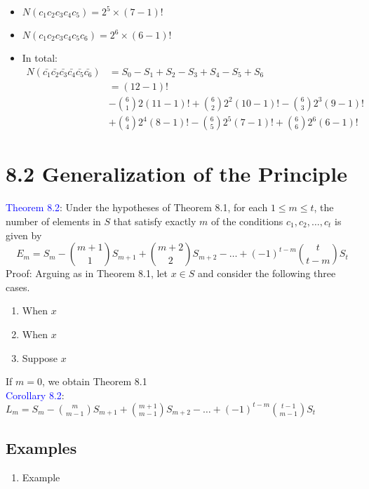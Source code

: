 \documentclass[a4paper]{article}
\begin{document}
\begin{enumerate}
\begin{itemize}
        \item $N(c_1c_2c_3c_4c_5)=2^5 \times (7-1)!$
        \item $N(c_1c_2c_3c_4c_5c_6)=2^6 \times (6-1)!$
        \item In total:\\
        \begin{align*}
            N(\bar{c_1}\bar{c_2}\bar{c_3}\bar{c_4}\bar{c_5}\bar{c_6})&=S_0-S_1+S_2-S_3+S_4-S_5+S_6\\
            &=(12-1)!\\
            &-\binom{6}{1}2(11-1)!+\binom{6}{2}2^2(10-1)!-\binom{6}{3}2^3(9-1)!\\
            &+\binom{6}{4}2^4(8-1)!-\binom{6}{5}2^5(7-1)!+\binom{6}{6}2^6(6-1)!
        \end{align*}
    \end{itemize}
\end{enumerate}
\section*{8.2 Generalization of the Principle}
\textcolor{blue}{Theorem 8.2}: Under the hypotheses of Theorem 8.1, for each $1\leq m\leq t$, the number of elements in $S$ that satisfy exactly $m$ of the conditions $c_1, c_2, \dots, c_t$ is given by
$$
E_m=S_m-\binom{m+1}{1}S_{m+1}+\binom{m+2}{2}S_{m+2}-\dots +(-1)^{t-m}\binom{t}{t-m}S_t
$$
Proof: Arguing as in Theorem 8.1, let $x\in S$ and consider the following three cases.
\begin{enumerate}
    \item When $x$
    \item When $x$
    \item Suppose $x$
\end{enumerate}

If $m=0$, we obtain Theorem 8.1\\
\textcolor{blue}{Corollary 8.2}:  $L_m=S_m-\binom{m}{m-1}S_{m+1}+\binom{m+1}{m-1}S_{m+2}-\dots +(-1)^{t-m}\binom{t-1}{m-1}S_t$
\subsection*{Examples}
\begin{enumerate}
    \item Example
\end{enumerate}
\end{document}
